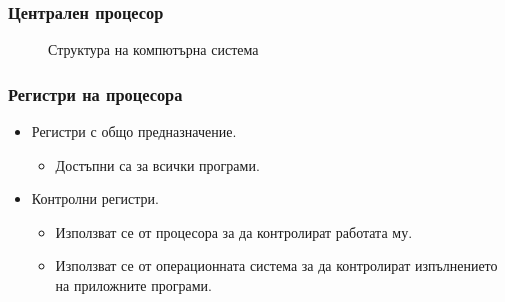 \documentclass[ignorenonframetext, hyperref=unicode]{beamer}
\begin{document}
\begin{frame}
\frametitle{Централен процесор}
\begin{figure}[h]
\center
{}
\caption{Структура на компютърна система}
\end{figure}
\end{frame}


\begin{frame}
\frametitle{Регистри на процесора}
\begin{itemize}
\item Регистри с общо предназначение.
\begin{itemize}
  \item Достъпни са за всички програми.
\end{itemize}
\item Контролни регистри.
\begin{itemize}
  \item Използват се от процесора за да контролират работата му.
  \item Използват се от операционната система за да контролират изпълнението на
  приложните програми.
\end{itemize}
\end{itemize}
\end{frame}
\end{document}
